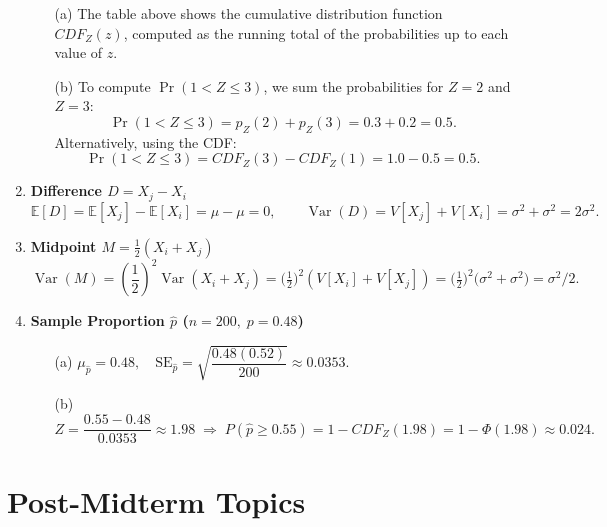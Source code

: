 \documentclass{article}
\begin{document}
\begin{enumerate}
  \begin{enumerate}
    \item[(a)] The table above shows the cumulative distribution function $CDF_Z(z)$, computed as the running total of the probabilities up to each value of $z$.

    \item[(b)] To compute \( \Pr(1 < Z \le 3) \), we sum the probabilities for $Z = 2$ and $Z = 3$:
    \[
    \Pr(1 < Z \le 3) = p_Z(2) + p_Z(3) = 0.3 + 0.2 = 0.5.
    \]
    Alternatively, using the CDF:
    \[
    \Pr(1 < Z \le 3) = CDF_Z(3) - CDF_Z(1) = 1.0 - 0.5 = 0.5.
    \]
  \end{enumerate}


\item \textbf{Difference \(D=X_j-X_i\)}  
      \[
        \mathbb E[D]= \mathbb E[X_j] - \mathbb E[X_i]= \mu-\mu=0,\qquad
        \operatorname{Var}(D)=V[X_j] + V[X_i]=\sigma^2+\sigma^2=2\sigma^2.
      \]

\item \textbf{Midpoint \(M=\tfrac12(X_i+X_j)\)}  
      \[
        \operatorname{Var}(M)
        = \left(\frac{1}{2}\right)^2\operatorname{Var}(X_i+X_j) 
        = \bigl(\tfrac12\bigr)^2(V[X_i]+V[X_j])
        =
        \bigl(\tfrac12\bigr)^2\bigl(\sigma^2+\sigma^2\bigr)=\sigma^2/2.
      \]

\item \textbf{Sample Proportion \(\hat p\) (\(n=200,\;p=0.48\))}  
      \begin{enumerate}
        \item[(a)] \(\mu_{\hat p}=0.48,\quad
                     \mathrm{SE}_{\hat p}=\sqrt{\dfrac{0.48(0.52)}{200}}\approx 0.0353.\)
        \item[(b)] \(Z=\dfrac{0.55-0.48}{0.0353}\approx 1.98\;\Rightarrow\;
                    P(\hat p\ge 0.55)=1-CDF_Z(1.98)=1-\Phi(1.98)\approx 0.024.\)
      \end{enumerate}
\end{enumerate}


\section{Post-Midterm Topics}

\end{document}
